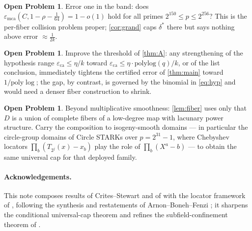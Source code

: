 \documentclass[11pt]{article}
\theoremstyle{definition}
\newtheorem{problem}[theorem]{Open Problem}
\theoremstyle{remark}
\newcommand{\eca}{\varepsilon_{\mathrm{ca}}}
\newcommand{\emca}{\varepsilon_{\mathrm{mca}}}
\begin{document}
\begin{problem}\label{prob:errorone}
Error one in the band: does $\emca(C,1-\rho-\frac1{64})=1-o(1)$ hold for all primes $2^{150}\le p\le2^{256}$? This is the per-fiber collision problem proper; \cref{cor:grand} caps $\delta^*$ there but says nothing above error $\approx\frac1{2k}$.
\end{problem}

\begin{problem}
Improve the threshold of \cref{thm:A}: any strengthening of the hypothesis range $\eca\le\eta/k$ toward $\eca\le\eta\cdot\mathrm{polylog}(q)/k$, or of the list conclusion, immediately tightens the certified error of \cref{thm:main} toward $1/\mathrm{poly}\log$; the gap, by contrast, is governed by the binomial in \eqref{eq:hyp} and would need a denser fiber construction to shrink.
\end{problem}

\begin{problem}
Beyond multiplicative smoothness: \cref{lem:fiber} uses only that $D$ is a union of complete fibers of a low-degree map with lacunary power structure. Carry the composition to isogeny-smooth domains --- in particular the circle-group domains of Circle STARKs over $p=2^{31}-1$, where Chebyshev locators $\prod_b(T_{2^j}(x)-x_b)$ play the role of $\prod_b(X^a-b)$ --- to obtain the same universal cap for that deployed family.
\end{problem}

\paragraph{Acknowledgements.} This note composes results of Crites--Stewart \cite{CS25} and of \cite{BCHKS25} with the locator framework of \cite{Cho26a,Cho26b}, following the synthesis and restatements of Arnon--Boneh--Fenzi \cite{ABF26}; it sharpens the conditional universal-cap theorem and refines the subfield-confinement theorem of \cite{Cho26b}.
\end{document}
